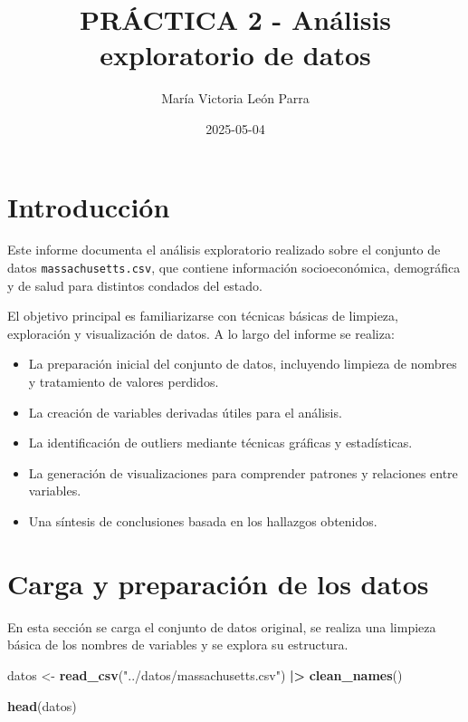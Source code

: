 \documentclass[
]{article}
\title{PRÁCTICA 2 - Análisis exploratorio de datos}
\author{María Victoria León Parra}
\date{2025-05-04}
\newenvironment{Shaded}{\begin{snugshade}}{\end{snugshade}}
\newcommand{\FunctionTok}[1]{\textcolor[rgb]{0.13,0.29,0.53}{\textbf{#1}}}
\newcommand{\NormalTok}[1]{#1}
\newcommand{\OtherTok}[1]{\textcolor[rgb]{0.56,0.35,0.01}{#1}}
\newcommand{\SpecialCharTok}[1]{\textcolor[rgb]{0.81,0.36,0.00}{\textbf{#1}}}
\newcommand{\StringTok}[1]{\textcolor[rgb]{0.31,0.60,0.02}{#1}}
\providecommand{\tightlist}{%
  \setlength{\itemsep}{0pt}\setlength{\parskip}{0pt}}
\begin{document}
\maketitle

{
\setcounter{tocdepth}{2}
\tableofcontents
}
\newpage

\section{Introducción}\label{introducciuxf3n}

Este informe documenta el análisis exploratorio realizado sobre el
conjunto de datos \texttt{massachusetts.csv}, que contiene información
socioeconómica, demográfica y de salud para distintos condados del
estado.

El objetivo principal es familiarizarse con técnicas básicas de
limpieza, exploración y visualización de datos. A lo largo del informe
se realiza:

\begin{itemize}
\tightlist
\item
  La preparación inicial del conjunto de datos, incluyendo limpieza de
  nombres y tratamiento de valores perdidos.
\item
  La creación de variables derivadas útiles para el análisis.
\item
  La identificación de outliers mediante técnicas gráficas y
  estadísticas.
\item
  La generación de visualizaciones para comprender patrones y relaciones
  entre variables.
\item
  Una síntesis de conclusiones basada en los hallazgos obtenidos.
\end{itemize}

\newpage

\section{Carga y preparación de los
datos}\label{carga-y-preparaciuxf3n-de-los-datos}

En esta sección se carga el conjunto de datos original, se realiza una
limpieza básica de los nombres de variables y se explora su estructura.

\begin{Shaded}
\begin{Highlighting}[]
\NormalTok{datos }\OtherTok{\textless{}{-}} \FunctionTok{read\_csv}\NormalTok{(}\StringTok{"../datos/massachusetts.csv"}\NormalTok{) }\SpecialCharTok{|\textgreater{}} 
  \FunctionTok{clean\_names}\NormalTok{()}

\FunctionTok{head}\NormalTok{(datos)}
\end{Highlighting}
\end{Shaded}
\end{document}
